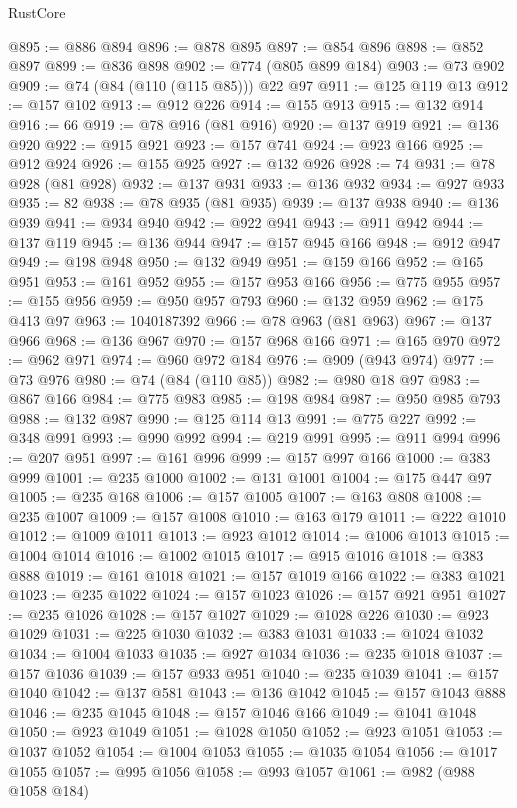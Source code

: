 \begin{lexlean}{RustCore}
\begin{coremodule}
@895 := @886 @894
@896 := @878 @895
@897 := @854 @896
@898 := @852 @897
@899 := @836 @898
@902 := @774 (@805 @899 @184)
@903 := @73 @902
@909 := @74 (@84 (@110 (@115 @85))) @22 @97
@911 := @125 @119 @13
@912 := @157 @102
@913 := @912 @226
@914 := @155 @913
@915 := @132 @914
@916 := 66
@919 := @78 @916 (@81 @916)
@920 := @137 @919
@921 := @136 @920
@922 := @915 @921
@923 := @157 @741
@924 := @923 @166
@925 := @912 @924
@926 := @155 @925
@927 := @132 @926
@928 := 74
@931 := @78 @928 (@81 @928)
@932 := @137 @931
@933 := @136 @932
@934 := @927 @933
@935 := 82
@938 := @78 @935 (@81 @935)
@939 := @137 @938
@940 := @136 @939
@941 := @934 @940
@942 := @922 @941
@943 := @911 @942
@944 := @137 @119
@945 := @136 @944
@947 := @157 @945 @166
@948 := @912 @947
@949 := @198 @948
@950 := @132 @949
@951 := @159 @166
@952 := @165 @951
@953 := @161 @952
@955 := @157 @953 @166
@956 := @775 @955
@957 := @155 @956
@959 := @950 @957 @793
@960 := @132 @959
@962 := @175 @413 @97
@963 := 1040187392
@966 := @78 @963 (@81 @963)
@967 := @137 @966
@968 := @136 @967
@970 := @157 @968 @166
@971 := @165 @970
@972 := @962 @971
@974 := @960 @972 @184
@976 := @909 (@943 @974)
@977 := @73 @976
@980 := @74 (@84 (@110 @85))
@982 := @980 @18 @97
@983 := @867 @166
@984 := @775 @983
@985 := @198 @984
@987 := @950 @985 @793
@988 := @132 @987
@990 := @125 @114 @13
@991 := @775 @227
@992 := @348 @991
@993 := @990 @992
@994 := @219 @991
@995 := @911 @994
@996 := @207 @951
@997 := @161 @996
@999 := @157 @997 @166
@1000 := @383 @999
@1001 := @235 @1000
@1002 := @131 @1001
@1004 := @175 @447 @97
@1005 := @235 @168
@1006 := @157 @1005
@1007 := @163 @808
@1008 := @235 @1007
@1009 := @157 @1008
@1010 := @163 @179
@1011 := @222 @1010
@1012 := @1009 @1011
@1013 := @923 @1012
@1014 := @1006 @1013
@1015 := @1004 @1014
@1016 := @1002 @1015
@1017 := @915 @1016
@1018 := @383 @888
@1019 := @161 @1018
@1021 := @157 @1019 @166
@1022 := @383 @1021
@1023 := @235 @1022
@1024 := @157 @1023
@1026 := @157 @921 @951
@1027 := @235 @1026
@1028 := @157 @1027
@1029 := @1028 @226
@1030 := @923 @1029
@1031 := @225 @1030
@1032 := @383 @1031
@1033 := @1024 @1032
@1034 := @1004 @1033
@1035 := @927 @1034
@1036 := @235 @1018
@1037 := @157 @1036
@1039 := @157 @933 @951
@1040 := @235 @1039
@1041 := @157 @1040
@1042 := @137 @581
@1043 := @136 @1042
@1045 := @157 @1043 @888
@1046 := @235 @1045
@1048 := @157 @1046 @166
@1049 := @1041 @1048
@1050 := @923 @1049
@1051 := @1028 @1050
@1052 := @923 @1051
@1053 := @1037 @1052
@1054 := @1004 @1053
@1055 := @1035 @1054
@1056 := @1017 @1055
@1057 := @995 @1056
@1058 := @993 @1057
@1061 := @982 (@988 @1058 @184)

\end{coremodule}
\end{lexlean}
